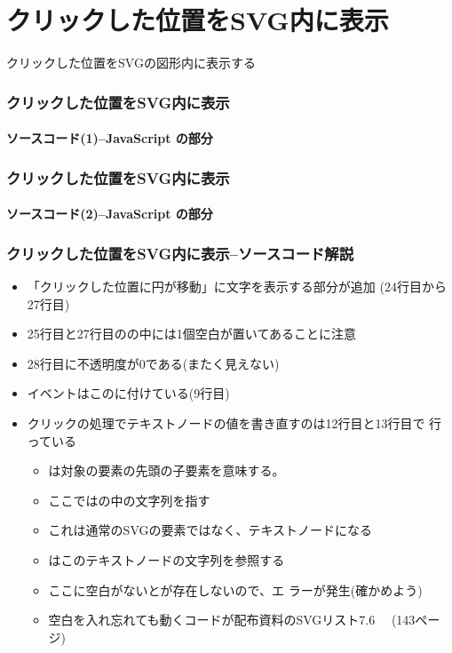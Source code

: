 

\frame{\maketitle}
\section{クリックした位置をSVG内に表示}
\begin{frame}[containsverbatim]
クリックした位置をSVGの図形内に表示する
\end{frame}
\begin{frame}[containsverbatim]
 \frametitle{クリックした位置をSVG内に表示}
 \framesubtitle{ソースコード(1)--JavaScript の部分}
\end{frame}
\begin{frame}[containsverbatim]
 \frametitle{クリックした位置をSVG内に表示}
 \framesubtitle{ソースコード(2)--JavaScript の部分}
\end{frame}
\begin{frame}[containsverbatim]
 \frametitle{クリックした位置をSVG内に表示--ソースコード解説}
 \begin{itemize}
  \item 「クリックした位置に円が移動」に文字を表示する部分が追加
        (24行目から27行目)
  \item 25行目と27行目のの中には1個空白が置いてあることに注意
  \item 28行目に不透明度が$0$である(またく見えない)
  \item {}イベントはこのに付けている(9行目)
  \item クリックの処理でテキストノードの値を書き直すのは12行目と13行目で
        行っている
        \begin{itemize}
         \item {}は対象の要素の先頭の子要素を意味する。
         \item ここではの中の文字列を指す
         \item これは通常のSVGの要素ではなく、テキストノードになる
         \item {}はこのテキストノードの文字列を参照する
         \item ここに空白がないとが存在しないので、エ
               ラーが発生(確かめよう)
         \item 空白を入れ忘れても動くコードが配布資料のSVGリスト7.6　
               (143ページ)
        \end{itemize}
 \end{itemize}
\end{frame}
